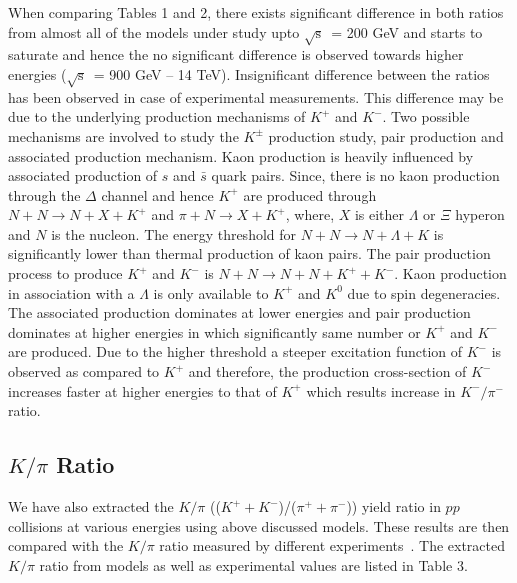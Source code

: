 \documentclass{article}
\newcommand{\sqrts}{\mbox{$\sqrt{\mathrm{s}}$}}
\newcommand{\lam}{$\Lambda$}
\begin{document}

When comparing Tables 1 and 2, there exists significant difference in both ratios from almost all of the models under study upto \sqrts~= 200 GeV and starts to saturate and hence the no significant difference is observed towards higher energies (\sqrts~= 900 GeV -- 14 TeV). Insignificant difference between the ratios has been observed in case of experimental measurements. This difference may be due to the underlying production mechanisms of $K^+$ and $K^-$. Two possible mechanisms are involved to study the $K^\pm$ production study, pair production and associated production mechanism. Kaon production is heavily influenced by associated production of $s$ and $\bar s$ quark pairs. Since, there is no kaon production through the $\Delta$ channel and hence $K^+$ are produced through $N + N \rightarrow N + X + K^+$ and $\pi + N \rightarrow X + K^+$, where, $X$ is either {\lam} or $\Xi$ hyperon and $N$ is the nucleon. The energy threshold for $N + N \rightarrow N + \Lambda + K$ is significantly lower than thermal production of kaon pairs. The pair production process to produce $K^+$ and $K^-$ is $N + N \rightarrow N + N + K^+ + K^-$. Kaon production in association with a $\Lambda$ is only available to $K^+$ and $K^0$ due to spin degeneracies. The associated production dominates at lower energies and pair production dominates at higher energies in which significantly same number or $K^+$ and $K^-$ are produced. Due to the higher threshold a steeper excitation function of $K^-$ is observed as compared to $K^+$ and therefore, the production cross-section of $K^-$ increases faster at higher energies to that of $K^+$ which results increase in $K^-/\pi^-$ ratio.           






\subsection{$K/\pi$ Ratio}

We have also extracted the $K/\pi$ (($K^+ + K^-$)/($\pi^+ + \pi^-$)) yield ratio in $pp$ collisions at various energies using above discussed models. These results are then compared with the $K/\pi$ ratio measured by different experiments~\cite{Pulawski:2015tka, NA49:2009brx, PHENIX:2011rvu, STAR:2008med, ALICE:2011gmo, ALICE:2015ial}. The extracted $K/\pi$ ratio from models as well as experimental values are listed in Table 3.     
\end{document}

